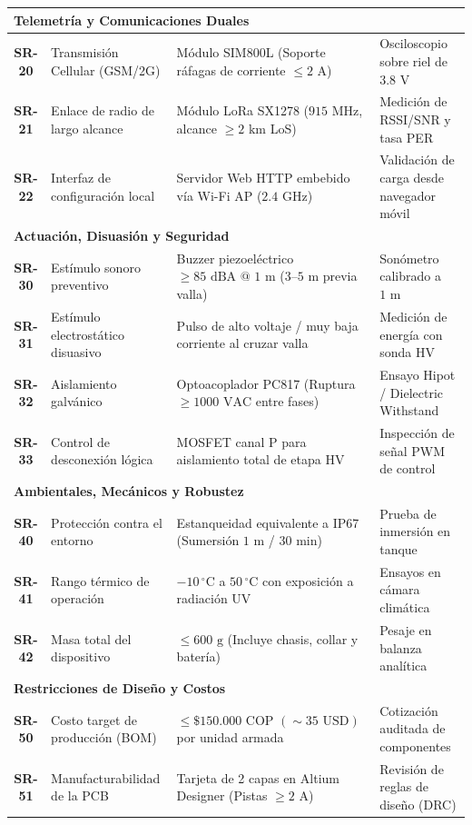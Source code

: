\begin{table}[H]
\begin{tabularx}{\linewidth}{|c|X|X|X|}
        \multicolumn{4}{|l|}{\cellcolor{gray!20}\textbf{Telemetría y Comunicaciones Duales}} \\ \hline
        \textbf{SR-20} & Transmisión Cellular (GSM/2G) & Módulo SIM800L (Soporte ráfagas de corriente $\le 2\text{ A}$) & Osciloscopio sobre riel de $3.8\text{ V}$ \\ \hline
        \textbf{SR-21} & Enlace de radio de largo alcance & Módulo LoRa SX1278 ($915\text{ MHz}$, alcance $\ge 2\text{ km}$ LoS) & Medición de RSSI/SNR y tasa PER \\ \hline
        \textbf{SR-22} & Interfaz de configuración local & Servidor Web HTTP embebido vía Wi-Fi AP ($2.4\text{ GHz}$) & Validación de carga desde navegador móvil \\ \hline

        \multicolumn{4}{|l|}{\cellcolor{gray!20}\textbf{Actuación, Disuasión y Seguridad}} \\ \hline
        \textbf{SR-30} & Estímulo sonoro preventivo & Buzzer piezoeléctrico $\ge 85\text{ dBA @ 1 m}$ ($3\text{--}5\text{ m}$ previa valla) & Sonómetro calibrado a $1\text{ m}$ \\ \hline
        \textbf{SR-31} & Estímulo electrostático disuasivo & Pulso de alto voltaje / muy baja corriente al cruzar valla & Medición de energía con sonda HV \\ \hline
        \textbf{SR-32} & Aislamiento galvánico & Optoacoplador PC817 (Ruptura $\ge 1000\text{ VAC}$ entre fases) & Ensayo Hipot / Dielectric Withstand \\ \hline
        \textbf{SR-33} & Control de desconexión lógica & MOSFET canal P para aislamiento total de etapa HV & Inspección de señal PWM de control \\ \hline

        \multicolumn{4}{|l|}{\cellcolor{gray!20}\textbf{Ambientales, Mecánicos y Robustez}} \\ \hline
        \textbf{SR-40} & Protección contra el entorno & Estanqueidad equivalente a IP67 (Sumersión $1\text{ m}$ / $30\text{ min}$) & Prueba de inmersión en tanque \\ \hline
        \textbf{SR-41} & Rango térmico de operación & $-10\,^\circ\text{C}$ a $50\,^\circ\text{C}$ con exposición a radiación UV & Ensayos en cámara climática \\ \hline
        \textbf{SR-42} & Masa total del dispositivo & $\le 600\text{ g}$ (Incluye chasis, collar y batería) & Pesaje en balanza analítica \\ \hline

        \multicolumn{4}{|l|}{\cellcolor{gray!20}\textbf{Restricciones de Diseño y Costos}} \\ \hline
        \textbf{SR-50} & Costo target de producción (BOM) & $\le \$150.000\text{ COP} \,\, (\sim 35\text{ USD})$ por unidad armada & Cotización auditada de componentes \\ \hline
        \textbf{SR-51} & Manufacturabilidad de la PCB & Tarjeta de 2 capas en Altium Designer (Pistas $\ge 2\text{ A}$) & Revisión de reglas de diseño (DRC) \\ \hline
    \end{tabularx}
\end{table}